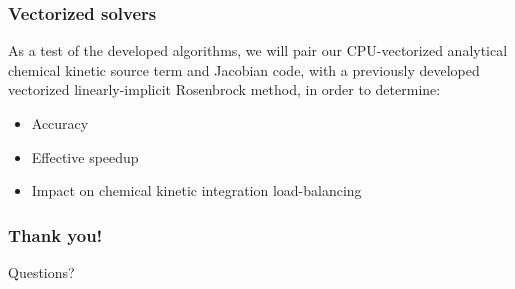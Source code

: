 \documentclass{beamer}
\begin{document}
\begin{frame}
 \frametitle{Vectorized solvers}
 As a test of the developed algorithms, we will pair our CPU-vectorized analytical chemical kinetic source term and Jacobian code, with a previously developed vectorized linearly-implicit Rosenbrock method, in order to determine:
 \begin{itemize}
  \item Accuracy
  \item Effective speedup
  \item Impact on chemical kinetic integration load-balancing
 \end{itemize}
\end{frame}

\begin{frame}
 \frametitle{Thank you!}
 \large Questions?
\end{frame}
\end{document}
